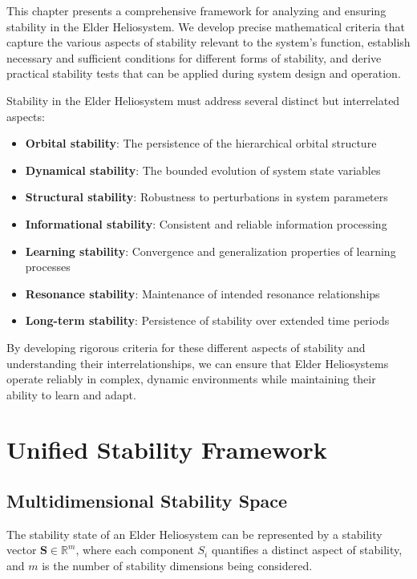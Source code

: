 This chapter presents a comprehensive framework for analyzing and ensuring stability in the Elder Heliosystem. We develop precise mathematical criteria that capture the various aspects of stability relevant to the system's function, establish necessary and sufficient conditions for different forms of stability, and derive practical stability tests that can be applied during system design and operation.

Stability in the Elder Heliosystem must address several distinct but interrelated aspects:
\begin{itemize}
    \item \textbf{Orbital stability}: The persistence of the hierarchical orbital structure
    \item \textbf{Dynamical stability}: The bounded evolution of system state variables
    \item \textbf{Structural stability}: Robustness to perturbations in system parameters
    \item \textbf{Informational stability}: Consistent and reliable information processing
    \item \textbf{Learning stability}: Convergence and generalization properties of learning processes
    \item \textbf{Resonance stability}: Maintenance of intended resonance relationships
    \item \textbf{Long-term stability}: Persistence of stability over extended time periods
\end{itemize}

By developing rigorous criteria for these different aspects of stability and understanding their interrelationships, we can ensure that Elder Heliosystems operate reliably in complex, dynamic environments while maintaining their ability to learn and adapt.

\section{Unified Stability Framework}

\subsection{Multidimensional Stability Space}

\begin{definition}
The stability state of an Elder Heliosystem can be represented by a stability vector $\mathbf{S} \in \mathbb{R}^m$, where each component $S_i$ quantifies a distinct aspect of stability, and $m$ is the number of stability dimensions being considered.
\end{definition}

